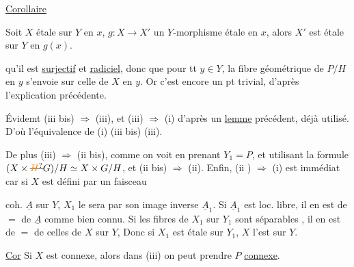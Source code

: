 

\uline{Corollaire}

Soit $X$ étale sur $Y$ en $x$, $g:X\longrightarrow X'$ un $Y$-morphisme étale en $x$, alors $X'$ est étale sur $Y$ en $g(x)$.


qu'il est \uline{surjectif} et \uline{radiciel}, donc que pour tt $y\in Y$, la fibre géométrique de $P/H$  en $y$ s'envoie  sur celle de $X$ en $y$. Or c'est encore un pt trivial, d'après l'explication précédente.


Évidemt (iii bis) $\Rightarrow$ (iii), et (iii) $\Rightarrow$ (i) d'après un \uline{lemme} précédent, déjà utilisé. D'où l'équivalence de (i) (iii bis) (iii).

De plus (iii) $\Rightarrow$ (ii bis), comme on voit en prenant $Y_1=P$, et utilisant la formule $(X\times\deleted{\unsure{H}}G)/H\simeq X\times G/H$, et (ii bis) $\Rightarrow$ (ii). Enfin, (ii ) $\Rightarrow$ (i) est immédiat \deleted{[car la condition \unsure{sur les}} car si $X$ est défini par un faisceau


coh. $\underline A$ sur $Y$, $X_1$ le sera par son image inverse $\underline A_1$. Si $\underline A_1$ est loc. libre, il en est de $=$ de $\underline A$ comme bien connu. Si les fibres de $X_1$ sur $Y_1$ sont séparables , il en est de $=$ de celles de $X$ sur $Y$,  Donc si $X_1$ est étale sur $Y_1$, $X$ l'est sur $Y$.

\uline{Cor} Si $X$ est connexe, alors dans (iii) on peut prendre $P$ \uline{connexe}.


